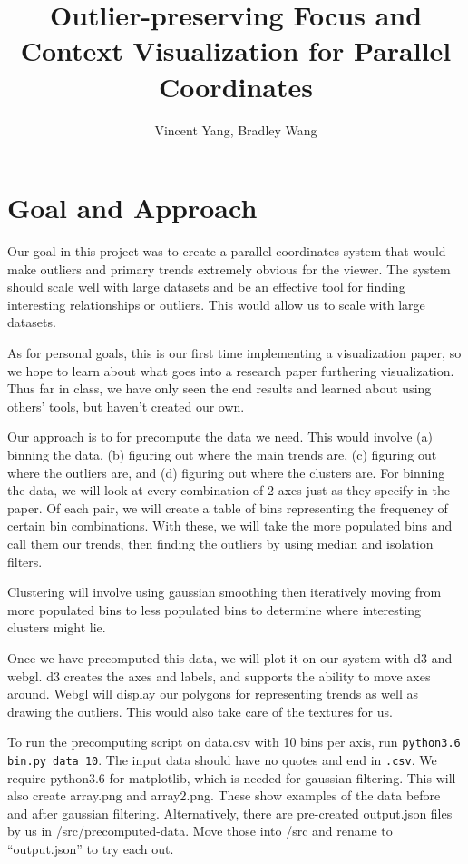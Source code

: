 \documentclass[	DIV=calc,%
			paper=a4,%
			fontsize=11pt,%
			twocolumn]{scrartcl}					%
\title{Outlier-preserving Focus and Context Visualization for Parallel Coordinates}		%
\author{Vincent Yang, Bradley Wang }			%
\date{}										%
\begin{document}
\maketitle
\thispagestyle{fancy} 								%


\section {Goal and Approach}
Our goal in this project was to create a parallel coordinates system that would make outliers and primary trends extremely obvious for the viewer. The system should scale well with large datasets and be an effective tool for finding interesting relationships or outliers. This would allow us
to scale with large datasets.

As for personal goals, this is our first time implementing a visualization paper, so we
hope to learn about what goes into a research paper furthering visualization. 
Thus far in class, we have only seen the end results and learned about using others' tools,
but haven't created our own. 

Our approach is to for precompute the data we need. This would involve (a) binning the data, (b) figuring out 
where the main trends are, (c) figuring out where the outliers are, and (d) figuring out where the clusters are. 
For binning the data, we will look at every combination of 2 axes just as they specify in the paper. Of each pair,
we will create a table of bins representing the frequency of certain bin combinations. With these, we will take the
more populated bins and call them our trends, then finding the outliers by using median and isolation filters.

Clustering will involve using gaussian smoothing then iteratively moving from more populated bins
to less populated bins to determine where interesting clusters might lie. 

Once we have precomputed this data, we will plot it on our system with d3 and webgl. d3 creates
the axes and labels, and supports the ability to move axes around. Webgl will display our polygons for
representing trends as well as drawing the outliers. This would also take care of the textures for us. 

To run the precomputing script on data.csv with 10 bins per axis, run \texttt{python3.6 bin.py data 10}. The input
data should have no quotes and end in \texttt{.csv}. We require python3.6 for matplotlib, which is needed
for gaussian filtering. This will also create array.png and array2.png. These show examples of the 
data before and after gaussian filtering. Alternatively, there are pre-created output.json files by us in /src/precomputed-data. 
Move those into /src and rename to ``output.json'' to try each out. 
\end{document}

